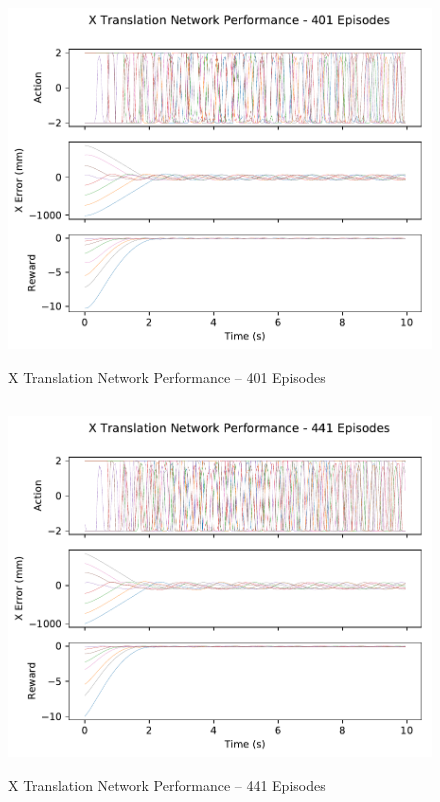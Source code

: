 \begin{figure}[H]
	\centering
	\includegraphics[width=6in, height=3.85in, keepaspectratio]{figures/train_figs/transx_transitions/1_401.pdf}
	\caption{X Translation Network Performance -- 401 Episodes}
\end{figure}
\begin{figure}[H]
	\centering
	\includegraphics[width=6in, height=3.85in, keepaspectratio]{figures/train_figs/transx_transitions/1_441.pdf}
	\caption{X Translation Network Performance -- 441 Episodes}
\end{figure}
